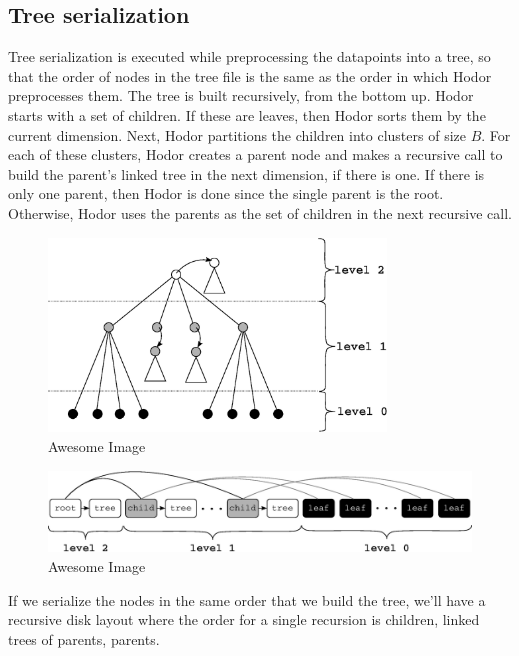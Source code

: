 \documentclass[11pt, oneside]{article}
\begin{document}
\subsection{Tree serialization}


Tree serialization is executed while preprocessing the datapoints into a tree,
so that the order of nodes in the tree file is the same as the order in which
Hodor preprocesses them. The tree is built recursively, from the bottom up.
Hodor starts with a set of children. If these are leaves, then Hodor sorts them
by the current dimension. Next, Hodor partitions the children into clusters of
size $B$. For each of these clusters, Hodor creates a parent node and makes a
recursive call to build the parent's linked tree in the next dimension, if
there is one. If there is only one parent, then Hodor is done since the single
parent is the root.  Otherwise, Hodor uses the parents as the set of children
in the next recursive call. 

\begin{figure}[p]
    \centering
    \includegraphics[width=0.8\textwidth]{fig1.eps}
    \caption{Awesome Image}
\end{figure}
\begin{figure}[p]
    \centering
    \includegraphics[width=1\textwidth]{fig2.eps}
    \caption{Awesome Image}
\end{figure}

If we serialize the nodes in the same order that we build the tree, we'll have
a recursive disk layout where the order for a single recursion is children,
linked trees of parents, parents. 
\end{document}
